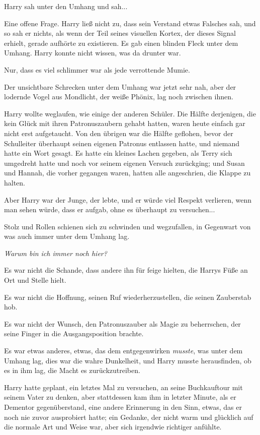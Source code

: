 {Harry sah unter den Umhang und sah...

Eine offene Frage. Harry ließ nicht zu, dass sein Verstand etwas Falsches sah, und so sah er nichts, als wenn der Teil seines visuellen Kortex, der dieses Signal erhielt, gerade aufhörte zu existieren. Es gab einen blinden Fleck unter dem Umhang. Harry konnte nicht wissen, was da drunter war.

Nur, dass es viel schlimmer war als jede verrottende Mumie.

Der unsichtbare Schrecken unter dem Umhang war jetzt sehr nah, aber der lodernde Vogel aus Mondlicht, der weiße Phönix, lag noch zwischen ihnen.

Harry wollte weglaufen, wie einige der anderen Schüler. Die Hälfte derjenigen, die kein Glück mit ihren Patronuszaubern gehabt hatten, waren heute einfach gar nicht erst aufgetaucht. Von den übrigen war die Hälfte geflohen, bevor der Schulleiter überhaupt seinen eigenen Patronus entlassen hatte, und niemand hatte ein Wort gesagt. Es hatte ein kleines Lachen gegeben, als Terry sich umgedreht hatte und noch vor seinem eigenen Versuch zurückging; und Susan und Hannah, die vorher gegangen waren, hatten alle angeschrien, die Klappe zu halten.

Aber Harry war der Junge, der lebte, und er würde viel Respekt verlieren, wenn man sehen würde, dass er aufgab, ohne es überhaupt zu versuchen...

Stolz und Rollen schienen sich zu schwinden und wegzufallen, in Gegenwart von was auch immer unter dem Umhang lag.

\emph{\emph{Warum bin ich immer noch hier?}}

Es war nicht die Schande, dass andere ihn für feige hielten, die Harrys Füße an Ort und Stelle hielt.

Es war nicht die Hoffnung, seinen Ruf wiederherzustellen, die seinen Zauberstab hob.

Es war nicht der Wunsch, den Patronuszauber als Magie zu beherrschen, der seine Finger in die Ausgangsposition brachte.

Es war etwas anderes, etwas, das dem entgegenwirken \emph{musste}, was unter dem Umhang lag, dies war die wahre Dunkelheit, und Harry musste herausfinden, ob es in ihm lag, die Macht es zurückzutreiben.

Harry hatte geplant, ein letztes Mal zu versuchen, an seine Buchkauftour mit seinem Vater zu denken, aber stattdessen kam ihm in letzter Minute, als er Dementor gegenüberstand, eine andere Erinnerung in den Sinn, etwas, das er noch nie zuvor ausprobiert hatte; ein Gedanke, der nicht warm und glücklich auf die normale Art und Weise war, aber sich irgendwie richtiger anfühlte.

}
